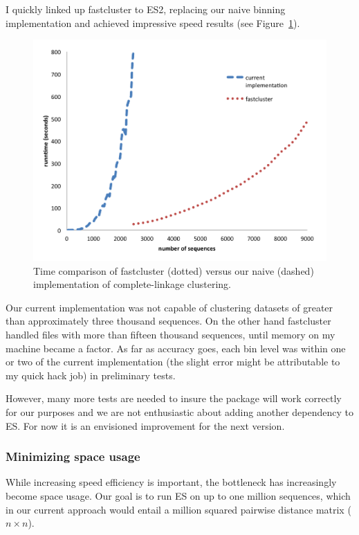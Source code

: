 I quickly linked up fastcluster to ES2, replacing our naive binning implementation and achieved impressive speed results (see Figure~\ref{fig:FastVsNaive}).

\begin{figure}[h!]
\centering
\includegraphics[scale=.8]{images/FastVsNaive-CH3}
\caption[Time comparison of fastcluster versus our naive implementation of complete-linkage clustering.]{Time comparison of fastcluster (dotted) versus our naive (dashed) implementation of complete-linkage clustering.}
\label{fig:FastVsNaive}
\end{figure}

Our current implementation was not capable of clustering datasets of greater than approximately three thousand sequences.
On the other hand fastcluster handled files with more than fifteen thousand sequences, until memory on my machine became a factor.
As far as accuracy goes, each bin level was within one or two of the current implementation (the slight error might be attributable to my quick hack job) in preliminary tests.

However, many more tests are needed to insure the package will work correctly for our purposes and we are not enthusiastic about adding another dependency to ES.
For now it is an envisioned improvement for the next version.

\subsubsection*{Minimizing space usage}
While increasing speed efficiency is important, the bottleneck has increasingly become space usage.
Our goal is to run ES on up to one million sequences, which in our current approach would entail a million squared pairwise distance matrix ($n \times n$).

